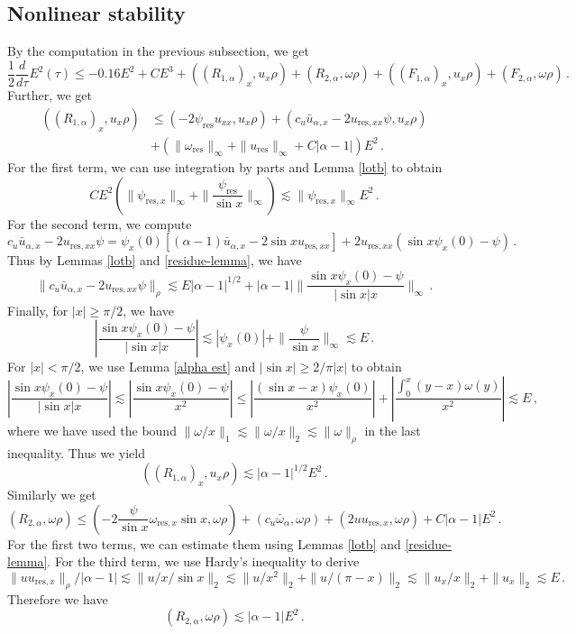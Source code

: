 \documentclass[12pt]{caltech_thesis}
\numberwithin{equation}{section}
\begin{document}
\subsection{Nonlinear stability}
By the computation in the previous subsection, we get 
\begin{equation*}
\label{nonlinearalpha}
    \frac{1}{2}\frac{d}{d\tau}E^2(\tau)\leq -0.16E^2+CE^3+((R_{1,\alpha})_x,u_x\rho)+(R_{2,\alpha},\omega\rho)+((F_{1,\alpha})_x,u_x\rho)+(F_{2,\alpha},\omega\rho)\,.
\end{equation*}
Further, we get
$$\begin{aligned}
    ((R_{1,\alpha})_x,u_x\rho)&\leq (-2\psi_{\text{res}}u_{xx},u_x\rho)+(c_u\bar{u}_{\alpha,x}-2u_{\text{res},xx}\psi,u_x\rho)\\&+(\|\omega_{\text{res}}\|_{\infty}+\|u_{\text{res}}\|_{\infty}+C|\alpha-1|)E^2\,.
\end{aligned}$$
For the first term, we can use integration by parts and Lemma  \ref{lotb} to obtain
$$CE^2(\|\psi_{\text{res},x}\|_{\infty}+\|\frac{\psi_{\text{res}}}{\sin x}\|_{\infty})\lesssim \|\psi_{\text{res},x}\|_{\infty}E^2\,.$$
For the second term, we compute $$c_u\bar{u}_{\alpha,x}-2u_{\text{res},xx}\psi=\psi_x(0)[(\alpha-1)\bar{u}_{\alpha,x}-2\sin x u_{\text{res},xx}]+2u_{\text{res},xx}(\sin x\psi_x(0)-\psi)\,.$$
Thus by Lemmas  \ref{lotb}  and \ref{residue-lemma}, we have \begin{equation}
    \label{important}
\|c_u\bar{u}_{\alpha,x}-2u_{\text{res},xx}\psi\|_{\rho}\lesssim E|\alpha-1|^{1/2} +|\alpha-1|\|\frac{\sin x\psi_x(0)-\psi}{|\sin x|x}\|_{\infty}\,.\end{equation}
Finally, for $|x|\geq \pi/2$, we have $$|\frac{\sin x\psi_x(0)-\psi}{|\sin x|x}|\lesssim |\psi_x(0)|+\|\frac{\psi}{\sin x}\|_{\infty}\lesssim E\,.$$
For $|x|< \pi/2$, we use Lemma \ref{alpha est} and $|\sin x|\geq 2/\pi |x|$ to obtain
$$|\frac{\sin x\psi_x(0)-\psi}{|\sin x|x}|\lesssim |\frac{\sin x\psi_x(0)-\psi}{x^2}|\leq |\frac{(\sin x-x)\psi_x(0)}{x^2}|+|\frac{\int_{0}^x(y-x)\omega (y)}{x^2}|\lesssim E\,,$$
where we have used the bound $\|\omega/x\|_{1}\lesssim\|\omega/x\|_{2}\lesssim\|\omega\|_{\rho}$ in the last inequality.
Thus we yield
$$((R_{1,\alpha})_x,u_x\rho)\lesssim |\alpha-1|^{1/2}E^2\,.$$
 Similarly we get $$(R_{2,\alpha},\omega\rho)\leq (-2\frac{\psi}{\sin x}\omega_{\text{res},x}\sin x,\omega\rho)+(c_u\bar{\omega}_{\alpha},\omega\rho)+(2uu_{\text{res},x},\omega\rho)+C|\alpha-1|E^2\,.$$
 For the first two terms, we can estimate them using Lemmas  \ref{lotb}  and \ref{residue-lemma}. For the third term, we use Hardy's inequality to derive
 $$\|uu_{\text{res},x}\|_{\rho}/|\alpha-1|\lesssim\|u/x/\sin x\|_{2}\lesssim \|u/x^2\|_{2}+\|u/(\pi-x)\|_{2}\lesssim\|u_x/x\|_{2}+\|u_x\|_{2}\lesssim E\,.$$
 Therefore we have 
 $$(R_{2,\alpha},\omega\rho)\lesssim|\alpha-1|E^2\,.$$
 
\end{document}
